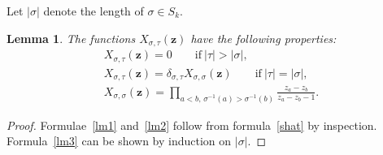 \documentclass[pdftex]{sigma}
\numberwithin{equation}{section}
\newtheorem{Lemma}[Theorem]{Lemma}
\begin{document}
Let $|\sigma|$ denote the length of $\sigma\in S_k$.
\begin{Lemma} \label{longperm} The functions $X_{\sigma,\tau}(\boldsymbol{z})$ have the following properties:
\begin{gather}\label{lm1}
X_{\sigma,\tau}(\boldsymbol{z})=0 \qquad \text{if} \ |\tau|>|\sigma|,
\\ \label{lm2}
X_{\sigma,\tau}(\boldsymbol{z})=\delta_{\sigma,\tau} X_{\sigma,\sigma}(\boldsymbol{z})
\qquad \text{if} \ |\tau|=|\sigma|,
\\ \label{lm3}
X_{\sigma,\sigma}(\boldsymbol{z})=\prod_{a<b,\,\sigma^{-1}(a)>\sigma^{-1}(b)}\frac{z_a-z_b}{z_a-z_b-1}.
\end{gather}
\end{Lemma}
\begin{proof}
Formulae~\eqref{lm1} and~\eqref{lm2} follow from formula~\eqref{shat} by inspection. Formula~\eqref{lm3} can be shown by induction on $|\sigma|$.
\end{proof}
\end{document}
